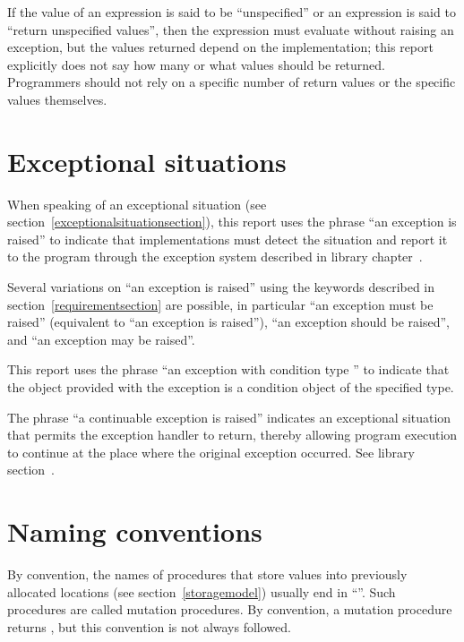 \vest If the value of an expression is said to be ``unspecified'' or
an expression is said to ``return unspecified values'',
then the expression must evaluate without raising an exception, but
the values returned depend on the implementation; this report
explicitly does not say how many or what values should be returned.
Programmers should not rely on a specific number of return values or
the specific values themselves.

\section{Exceptional situations}

When speaking of an exceptional situation (see section~\ref{exceptionalsituationsection}), this
report uses the phrase ``an exception is raised'' to indicate
that implementations must detect the situation and report it to the
program through the exception system described in
library chapter~.

Several variations on ``an exception is raised'' using the keywords
described in section~\ref{requirementsection} are possible, in
particular ``an exception must be raised'' (equivalent to ``an
exception is raised''), ``an exception should be raised'', and ``an
exception may be raised''.

This report uses the phrase ``an exception with condition type ''
to indicate that the object provided with the
exception is a condition object of the specified type.

The phrase ``a continuable exception is raised'' indicates an
exceptional situation that permits the exception handler to return,
thereby allowing program execution to continue at the place where the
original exception occurred.  See library
section~.

\section{Naming conventions}

By convention, the names of procedures that store values into previously
allocated locations (see section~\ref{storagemodel}) usually end in
``\ide{!}''.
Such procedures are called mutation procedures.
By convention, a mutation procedure returns
\unspecifiedreturn,
but this convention is not always followed.

